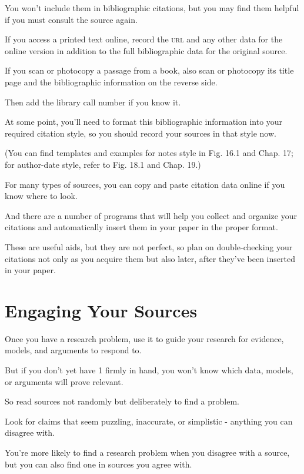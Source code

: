 \documentclass[oneside]{book}
\numberwithin{equation}{section}
\begin{document}
You won't include them in bibliographic citations, but you may find them helpful if you must consult the source again.

%
If you access a printed text online, record the \textsc{url} and any other data for the online version in addition to the full bibliographic data for the original source.

%
If you scan or photocopy a passage from a book, also scan or photocopy its title page and the bibliographic information on the reverse side.

Then add the library call number if you know it.

%
At some point, you'll need to format this bibliographic information into your required citation style, so you should record your sources in that style now.

(You can find templates and examples for notes style in Fig. 16.1 and Chap. 17; for author-date style, refer to Fig. 18.1 and Chap. 19.)

%
For many types of sources, you can copy and paste citation data online if you know where to look.

And there are a number of programs that will help you collect and organize your citations and automatically insert them in your paper in the proper format.

These are useful aids, but they are not perfect, so plan on double-checking your citations not only as you acquire them but also later, after they've been inserted in your paper.


\chapter{Engaging Your Sources}

Once you have a research problem, use it to guide your research for evidence, models, and arguments to respond to.

But if you don't yet have 1 firmly in hand, you won't know which data, models, or arguments will prove relevant.

So read sources not randomly but deliberately to find a problem.

Look for claims that seem puzzling, inaccurate, or simplistic - anything you can disagree with.

You're more likely to find a research problem when you disagree with a source, but you can also find one in sources you agree with.
\end{document}
